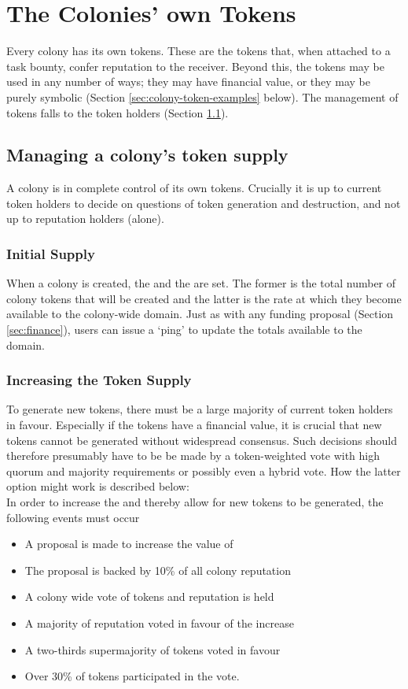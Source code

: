 \section{The Colonies' own Tokens}\label{sec:colony-tokens}
Every colony has its own tokens. These are the tokens that, when attached to a task bounty, confer reputation to the receiver. Beyond this, the tokens may be used in any number of ways; they may have financial value, or they may be purely symbolic (Section \ref{sec:colony-token-examples} below). The management of tokens falls to the token holders (Section \ref{sec:colony-token-management}).


\subsection{Managing a colony's token supply}\label{sec:colony-token-management}
A colony is in complete control of its own tokens. Crucially it is up to current token holders to decide on questions of token generation and destruction, and not up to reputation holders (alone).

\subsubsection{Initial Supply}
When a colony is created, the  and the  are set. The former is the total number of colony tokens that will be created and the latter is the rate at which they become available to the colony-wide domain. Just as with any funding proposal (Section \ref{sec:finance}), users can issue a `ping' to update the totals available to the domain.

\subsubsection{Increasing the Token Supply}
To generate new tokens, there must be a large majority of current token holders in favour. Especially if the tokens have a financial value, it is crucial that new tokens cannot be generated without widespread consensus. Such decisions should therefore presumably have to be be made by a token-weighted vote with high quorum and majority requirements or possibly even a hybrid vote. How the latter option might work is described below:\\

In order to increase the  and thereby allow for new tokens to be generated, the following events must occur
\begin{itemize}
 \item A proposal is made to increase the value of 
 \item The proposal is backed by 10\% of all colony reputation
 \item A colony wide vote of tokens and reputation is held
 \item A majority of reputation voted in favour of the increase
 \item A two-thirds supermajority of tokens voted in favour
 \item Over 30\% of tokens participated in the vote.
\end{itemize}

